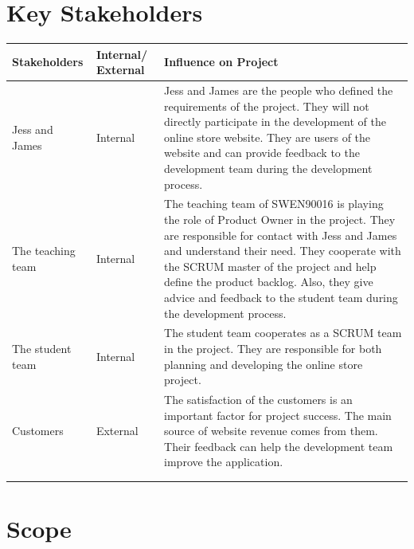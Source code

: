 \documentclass{report}
\begin{document}
\section{Key Stakeholders}
\begin{tabularx}{0.95\linewidth}{%
  >{\raggedright\arraybackslash}l%
  >{\raggedright\arraybackslash}p{1.5cm}%
  >{\raggedright\arraybackslash}X}
  \toprule
  Stakeholders & Internal/ External & Influence on Project \\
  \midrule
  Jess and James
  & Internal
  & Jess and James are the people who defined the requirements of the project. They will not directly participate in the development of the online store website. They are users of the website and can provide feedback to the development team during the development process.
  \\
  \midrule
  The teaching team
  & Internal
  & The teaching team of SWEN90016 is playing the role of Product Owner in the project. They are responsible for contact with Jess and James and understand their need.  They cooperate with the SCRUM master of the project and help define the product backlog. Also, they give advice and feedback to the student team during the development process.
  \\
  \midrule
  The student team
  & Internal
  & The student team cooperates as a SCRUM team in the project. They are responsible for both planning and developing the online store project. 
  \\
  \midrule
  Customers
  & External
  & The satisfaction of the customers is an important factor for project success. The main source of website revenue comes from them. Their feedback can help the development team improve the application.
  \\
  \bottomrule
  \\
  \caption{Stakeholder Register}  
  \label{tab:stakeholderRegister}
\end{tabularx}

\section{Scope}
\end{document}
